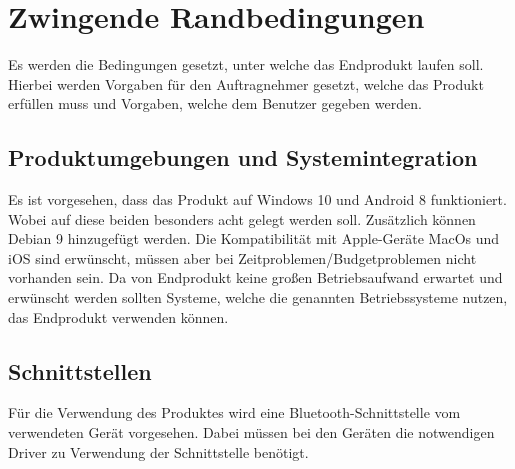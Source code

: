 \section{Zwingende Randbedingungen}
Es werden die Bedingungen gesetzt, unter welche das Endprodukt laufen soll. Hierbei werden Vorgaben für den Auftragnehmer gesetzt, welche das Produkt erfüllen muss und Vorgaben, welche dem Benutzer gegeben werden.
\subsection{Produktumgebungen und Systemintegration}
Es ist vorgesehen, dass das Produkt auf Windows 10 und Android 8 funktioniert. Wobei auf diese beiden besonders acht gelegt werden soll. Zusätzlich können Debian 9 hinzugefügt werden. Die Kompatibilität mit Apple-Geräte MacOs und iOS sind erwünscht, müssen aber bei Zeitproblemen/Budgetproblemen nicht vorhanden sein. Da von Endprodukt keine großen Betriebsaufwand erwartet und erwünscht werden sollten Systeme, welche die genannten Betriebssysteme nutzen, das Endprodukt verwenden können.
\subsection{Schnittstellen}
Für die Verwendung des Produktes wird eine Bluetooth-Schnittstelle vom verwendeten Gerät vorgesehen. Dabei müssen bei den Geräten die notwendigen Driver zu Verwendung der Schnittstelle benötigt.
